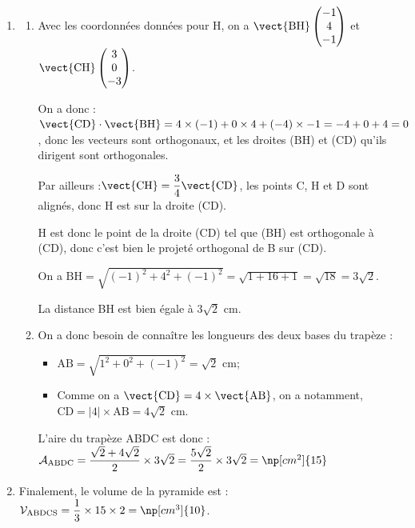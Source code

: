 \begin{enumerate}
\begin{enumerate}
	On arrive bien à SI = 2 unités graphique, et comme \Oijk{} est d'unité graphique 1 cm, on a bien SI = 2 cm.
\end{enumerate}
\item \begin{enumerate}
	\item Avec les coordonnées données pour H, on a $\vect{\mathrm{BH}} \begin{pmatrix}-1 \\ 4\\-1\end{pmatrix}$ et $\vect{\mathrm{CH}} \begin{pmatrix}3 \\ 0\\-3\end{pmatrix}$.

	On a donc : \quad $\vect{\mathrm{CD}}\cdot\vect{\mathrm{BH}} = 4\times (-1) + 0\times 4 + (-4) \times -1 = -4 + 0 + 4 = 0$, donc les vecteurs sont orthogonaux, et les droites (BH) et (CD) qu'ils dirigent sont orthogonales.

	Par ailleurs  :\quad $\vect{\mathrm{CH}} = \dfrac{3}{4}\vect{\mathrm{CD}}$, les points C, H et D sont alignés, donc H est sur la droite (CD).

	H est donc le point de la droite (CD) tel que (BH) est orthogonale à (CD), donc c'est bien le projeté orthogonal de B sur (CD).

	On a $\mathrm{BH} = \sqrt{(-1)^2 + 4^2 + (-1)^2 } = \sqrt{1 + 16 + 1} = \sqrt{18} = 3\sqrt{2}$.

	La distance BH est bien égale à $3\sqrt{2}$ cm.

	\item On a donc besoin de connaître les longueurs des deux bases du trapèze :
	\begin{itemize}
		\item $\mathrm{AB} = \sqrt{1^2 + 0^2 + (-1)^2} = \sqrt{2}$ cm;
		\item Comme on a $\vect{\mathrm{CD}} = 4\times \vect{\mathrm{AB}}$, on a notamment, $\mathrm{CD} = \left|4\right|\times \mathrm{AB} = 4\sqrt{2}$ cm.
	\end{itemize}

	L'aire du trapèze ABDC est donc :\quad $\mathcal{A}_{\mathrm{ABDC}} = \dfrac{\sqrt{2} + 4\sqrt{2}}{2}\times 3\sqrt{2} =\dfrac{5\sqrt{2}}{2}\times 3\sqrt{2}= \np[cm^2]{15} $
\end{enumerate}
\item Finalement, le volume de la pyramide est :\quad $\mathcal{V}_{\mathrm{ABDCS}} = \dfrac{1}{3} \times 15 \times 2 = \np[cm^3]{10}$.
\end{enumerate}

	\medskip

